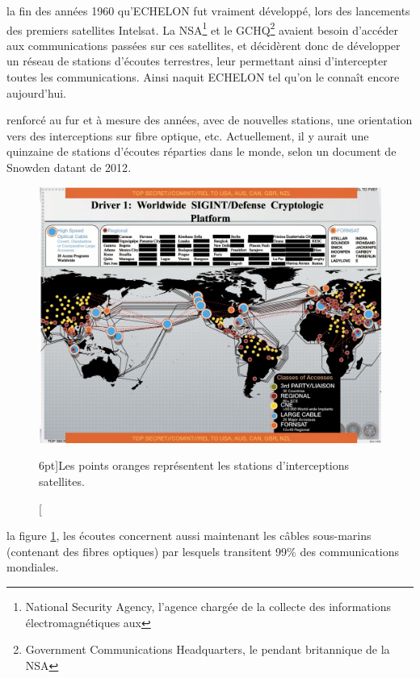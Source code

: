  la fin des années 1960\autocite{ZDNET} qu'ECHELON fut
vraiment développé, lors des lancements des premiers satellites Intelsat. La
NSA\footnote{National Security Agency, l'agence chargée de la collecte des
informations électromagnétiques aux \EUA} et le GCHQ\footnote{Government
Communications Headquarters, le pendant britannique de la NSA} avaient besoin
d'accéder aux communications passées sur ces satellites, et décidèrent
donc de développer un réseau de stations d'écoutes terrestres, leur permettant
ainsi d'intercepter toutes les communications. Ainsi naquit ECHELON tel qu'on le
connaît encore aujourd'hui.

 renforcé au fur et à mesure des années, avec de
nouvelles stations, une orientation vers des interceptions sur fibre optique,
etc. Actuellement, il y aurait une quinzaine de stations d'écoutes réparties
dans le monde, selon un document de Snowden datant de 2012\autocite{Stations}.

\vspace{0.7cm}
\begin{figure}
\includegraphics{graphics/carte.jpg}
\caption[Carte des stations d'interceptions][6pt]{Les points oranges
représentent les stations d'interceptions satellites.}
\label{fig:stations}
\end{figure}

 la figure \ref{fig:stations}, les écoutes
concernent aussi maintenant les câbles sous-marins (contenant des fibres optiques) par
lesquels transitent 99\% des communications mondiales. 

